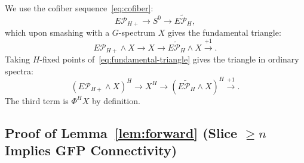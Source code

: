 \documentclass[12pt]{article}
\theoremstyle{definition}
\begin{document}
We use the cofiber sequence~\eqref{eq:cofiber}:
\[
   E\mathcal{P}_{H+} \longrightarrow S^0 \longrightarrow \widetilde{E\mathcal{P}_H},
\]
which upon smashing with a $G$-spectrum $X$ gives the fundamental triangle:
\begin{equation}\label{eq:fundamental-triangle}
   E\mathcal{P}_{H+} \wedge X \longrightarrow X \longrightarrow \widetilde{E\mathcal{P}_H} \wedge X \xrightarrow{+1}.
\end{equation}
Taking $H$-fixed points of~\eqref{eq:fundamental-triangle} gives the triangle in ordinary spectra:
\begin{equation}\label{eq:fixed-pt-triangle}
   (E\mathcal{P}_{H+} \wedge X)^H \longrightarrow X^H \longrightarrow (\widetilde{E\mathcal{P}_H}\wedge X)^H \xrightarrow{+1}.
\end{equation}
The third term is $\Phi^H X$ by definition.

\subsection{Proof of Lemma~\ref{lem:forward} (Slice $\geq n$ Implies GFP Connectivity)}
\end{document}
